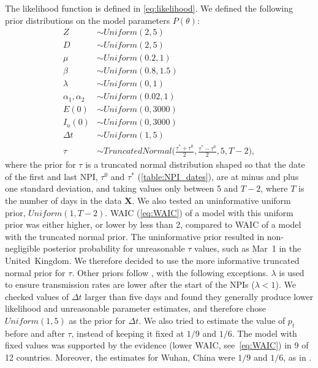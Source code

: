 \documentclass[12pt]{extarticle}
\let\vec\mathbf
\begin{document}
The likelihood function is defined in \autoref{eq:likelihood}.
We defined the following prior distributions on the model parameters $P(\theta)$: 
\begin{equation} \label{eq:priors}
\begin{aligned} 
Z & \sim \mathit{Uniform}(2, 5) \\
D & \sim \mathit{Uniform}(2, 5) \\
\mu & \sim \mathit{Uniform}(0.2, 1) \\
\beta & \sim \mathit{Uniform}(0.8, 1.5) \\
\lambda & \sim \mathit{Uniform}(0, 1) \\
\alpha_1, \alpha_2 & \sim \mathit{Uniform}(0.02, 1)\\
E(0) & \sim \mathit{Uniform}(0, 3000) \\
I_u(0) & \sim \mathit{Uniform}(0, 3000) \\
\Delta t & \sim \mathit{Uniform}(1, 5) \\
\tau &\sim \mathit{TruncatedNormal}\Big(\frac{\tau^*+\tau^0}{2}, \frac{\tau^*-\tau^0}{2}, 5, T-2\Big),
\end{aligned}
\end{equation}
where the prior for $\tau$ is a truncated normal distribution shaped so that the date of the first and last NPI, $\tau^0$ and $\tau^*$ (\autoref{table:NPI_dates}), are at minus and plus one standard deviation, and taking values only between 5 and  $T-2$, where $T$ is the number of days in the data $\vec{X}$.
We also tested an uninformative uniform prior, $\mathit{Uniform}(1,T-2)$.
WAIC (\autoref{eq:WAIC}) of a model with this uniform prior was either higher, or lower by less than 2, compared to WAIC of a model with the truncated normal prior.
The uninformative prior resulted in non-negligible posterior probability for unreasonable $\tau$ values, such as Mar~1 in the United~Kingdom. 
We therefore decided to use the more informative truncated normal prior for $\tau$.
Other priors follow \citet{Li2020}, with the following exceptions.
$\lambda$ is used to ensure transmission rates are lower after the start of the NPIs ($\lambda < 1$).
We checked values of $\Delta t$ larger than five days and found they generally produce lower likelihood and unreasonable parameter estimates, and therefore chose $\mathit{Uniform}(1,5)$ as the prior for $\Delta t$.
We also tried to estimate the value of $p_t$ before and after $\tau$, instead of keeping it fixed at $1/9$ and $1/6$. The model with fixed values was supported by the evidence (lower WAIC, see~\autoref{eq:WAIC}) in 9 of 12 countries. Moreover, the estimates for Wuhan, China were $1/9$ and $1/6$, as in \citet{Li2020}. 
\end{document}
